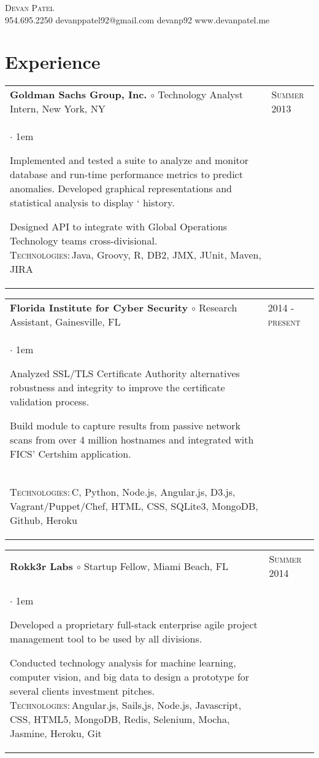 \documentclass[11pt]{article}
\makeatletter
\newcommand{\employer}[4]
    {{ \begin{tabular}{l@{\hspace{5mm}}|p{30mm}}
       \multicolumn{1}{l}{\textbf{#1 $\circ$ }#2}&\multicolumn{1}{p{30mm}}{\hspace{-3mm}\textsc{#3}} \\
       \parbox{.825\textwidth}{#4 \vspace*{-4pt}}
       \end{tabular} \vspace{4pt} }}
\newcommand{\contact}[5]
    {\begin{center}
        {\LARGE \scshape{#1}}\\
        \Telefon \hspace{0.5ex} #3 \hspace{1em} \Letter \hspace{0.5ex} #4 \hspace{1em} \faGithub \hspace{0.5ex} #5 \hspace{1em} \Mundus \hspace{0.5ex} www.devanpatel.me

    \end{center}
    \vspace*{-8pt}}
\newenvironment{achievements}           %
    {\begin{list}{$\cdot$}{\topsep 0pt \itemsep 4pt \parsep 0pt \leftmargin 1em}
     \linespread{1.05} \selectfont %
    }
    {\end{list}\vspace*{4pt}}
\def\kt{\vspace*{2pt}\\\textsc{Technologies:\,}}
\makeatother
\begin{document}
\contact{Devan Patel}
{\\}
{954.695.2250}
{devanppatel92@gmail.com}
{devanp92}

\section{Experience}

\employer{Goldman Sachs Group, Inc.}{Technology Analyst Intern, New York, NY}{Summer 2013}{
    \begin{achievements}

    \item{Implemented and tested a suite to analyze and monitor database and run-time performance metrics to predict anomalies. Developed graphical representations and statistical analysis to display ` history.}

    \item{Designed API to integrate with Global Operations Technology teams cross-divisional.\kt Java, Groovy, R, DB2, JMX, JUnit, Maven, JIRA}

    \end{achievements}
}

\employer{Florida Institute for Cyber Security}{Research Assistant, Gainesville, FL}{2014 - present} {
    \begin{achievements}

    \item{Analyzed SSL/TLS Certificate Authority alternatives robustness and integrity to improve the certificate validation process.}
    \item{Build module to capture results from passive network scans from over 4 million hostnames and integrated with FICS' Certshim application.}
    \item{\kt C, Python, Node.js, Angular.js, D3.js, Vagrant/Puppet/Chef, HTML, CSS, SQLite3, MongoDB, Github, Heroku}

    \end{achievements}
}

\employer{Rokk3r Labs}{Startup Fellow, Miami Beach, FL}{Summer 2014}{
\begin{achievements}

\item{Developed a proprietary full-stack enterprise agile project management tool to be used by all divisions.}

\item{Conducted technology analysis for machine learning, computer vision, and big data to design a prototype for several clients investment pitches. \kt Angular.js, Sails,js, Node.js, Javascript, CSS, HTML5, MongoDB, Redis, Selenium, Mocha, Jasmine, Heroku, Git}

\end{achievements}
}
\end{document}
